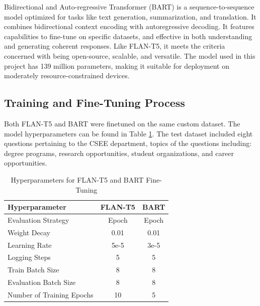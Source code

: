 \documentclass[conference]{IEEEtran}
\begin{document}
Bidirectional and Auto-regressive Transformer (BART) is a sequence-to-sequence model optimized for tasks like text generation, summarization, and translation. 
It combines bidirectional context encoding with autoregressive decoding. 
It features capabilities to fine-tune on specific datasets, and effective in both understanding and generating coherent responses.
Like FLAN-T5, it meets the criteria concerned with being open-source, scalable, and versatile. 
The model used in this project has 139 million parameters, making it suitable for deployment on moderately resource-constrained devices.

\subsection{Training and Fine-Tuning Process} 
Both FLAN-T5 and BART were finetuned on the same custom dataset. The model hyperparameters can be found in Table \ref{tab:hyperparams}.
The test dataset included eight questions pertaining to the CSEE department, topics of the questions including: degree programs, research opportunities, student organizations, and career opportunities. 

\begin{table}[!ht]
    \centering
    \caption{Hyperparameters for FLAN-T5 and BART Fine-Tuning}
    \label{tab:hyperparams}
    \begin{tabular}{l|c|c}
        \toprule
        \textbf{Hyperparameter}         & \textbf{FLAN-T5}         & \textbf{BART} \\
        \midrule
        Evaluation Strategy             & Epoch                   & Epoch                     \\ 
        Weight Decay                    & 0.01                    & 0.01                      \\ 
        Learning Rate                   & 5e-5                    & 3e-5                      \\ 
        Logging Steps                   & 5                       & 5                         \\ 
        Train Batch Size                & 8                       & 8                         \\ 
        Evaluation Batch Size           & 8                       & 8                         \\ 
        Number of Training Epochs       & 10                      & 5                         \\ 
        \bottomrule
    \end{tabular}
\end{table}
\end{document}

